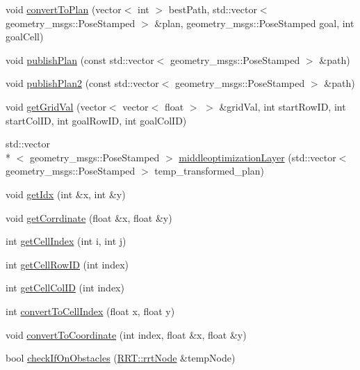 \begin{DoxyCompactItemize}
\item 
void \hyperlink{classrrt__plan_1_1rrt__planner_aac5e9f72b4c55ce4aada8d80eed92a9e}{convert\-To\-Plan} (vector$<$ int $>$ best\-Path, std\-::vector$<$ geometry\-\_\-msgs\-::\-Pose\-Stamped $>$ \&plan, geometry\-\_\-msgs\-::\-Pose\-Stamped goal, int goal\-Cell)
\item 
void \hyperlink{classrrt__plan_1_1rrt__planner_ac2fe5313cbc77dffddfcfe1f6605d53e}{publish\-Plan} (const std\-::vector$<$ geometry\-\_\-msgs\-::\-Pose\-Stamped $>$ \&path)
\item 
void \hyperlink{classrrt__plan_1_1rrt__planner_a3071190151c4463f2e39f29c02c1f55d}{publish\-Plan2} (const std\-::vector$<$ geometry\-\_\-msgs\-::\-Pose\-Stamped $>$ \&path)
\item 
void \hyperlink{classrrt__plan_1_1rrt__planner_aff6d98168c072b176287fc9c444349c6}{get\-Grid\-Val} (vector$<$ vector$<$ float $>$ $>$ \&grid\-Val, int start\-Row\-I\-D, int start\-Col\-I\-D, int goal\-Row\-I\-D, int goal\-Col\-I\-D)
\item 
std\-::vector\\*
$<$ geometry\-\_\-msgs\-::\-Pose\-Stamped $>$ \hyperlink{classrrt__plan_1_1rrt__planner_aac168be892772fe17a1d841d87c2249c}{middleoptimization\-Layer} (std\-::vector$<$ geometry\-\_\-msgs\-::\-Pose\-Stamped $>$ temp\-\_\-transformed\-\_\-plan)
\item 
void \hyperlink{classrrt__plan_1_1rrt__planner_a980538776b19bd9610458e45991cdf0b}{get\-Idx} (int \&x, int \&y)
\item 
void \hyperlink{classrrt__plan_1_1rrt__planner_a8f1fde39d2f3b01d7b2d11dc9482e1dc}{get\-Corrdinate} (float \&x, float \&y)
\item 
int \hyperlink{classrrt__plan_1_1rrt__planner_a7df38e380fe80d69be29d1cea2879c59}{get\-Cell\-Index} (int i, int j)
\item 
int \hyperlink{classrrt__plan_1_1rrt__planner_aa3c07d6b2b6bed62e4b60d3898fc80cf}{get\-Cell\-Row\-I\-D} (int index)
\item 
int \hyperlink{classrrt__plan_1_1rrt__planner_a758810b2f257fe0778ed3eb1e970d99c}{get\-Cell\-Col\-I\-D} (int index)
\item 
int \hyperlink{classrrt__plan_1_1rrt__planner_a2647265d06a792b983b372af52cf5677}{convert\-To\-Cell\-Index} (float x, float y)
\item 
void \hyperlink{classrrt__plan_1_1rrt__planner_ad21e1c308a79678ca6265907bf6caa84}{convert\-To\-Coordinate} (int index, float \&x, float \&y)
\item 
bool \hyperlink{classrrt__plan_1_1rrt__planner_a2b6ded4f6e7719510d94371400f097d7}{check\-If\-On\-Obstacles} (\hyperlink{structRRT_1_1rrtNode}{R\-R\-T\-::rrt\-Node} \&temp\-Node)

\end{DoxyCompactItemize}
